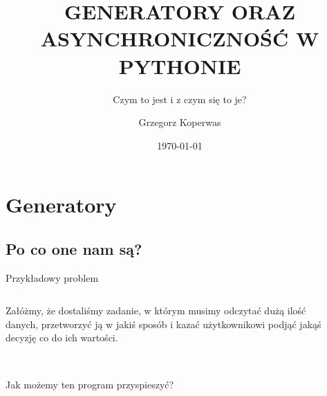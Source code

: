 \documentclass[aspectratio=169]{beamer}
\title{GENERATORY ORAZ\\ ASYNCHRONICZNOŚĆ W PYTHONIE}
\subtitle{Czym to jest i z czym się to je?}
\author{Grzegorz Koperwas}
\institute{STX Next}
\date{\today}
\begin{document}
\titleframe

\section{Generatory}
\subsection{Po co one nam są?}
\begin{frame}[fragile]{Przykładowy problem}

  \begin{columns}
    \begin{column}{0.4 \textwidth}

      Załóżmy, że dostaliśmy zadanie, w którym musimy odczytać dużą ilość danych,
      przetworzyć ją w jakiś sposób i kazać użytkownikowi podjąć jakąś decyzję
      co do ich wartości. \\~\\



    \end{column}
    \begin{column}{0.5 \textwidth}
      
      \scriptsize
      \inputminted[linenos, stripall]{python}{./examples/naive.py}

    \end{column}

  \end{columns}

\end{frame}

\begin{frame}[fragile]{Jak możemy ten program przyspieszyć?}

      \inputminted[linenos, stripall]{python}{./examples/naive.py}

\end{frame}
\end{document}
